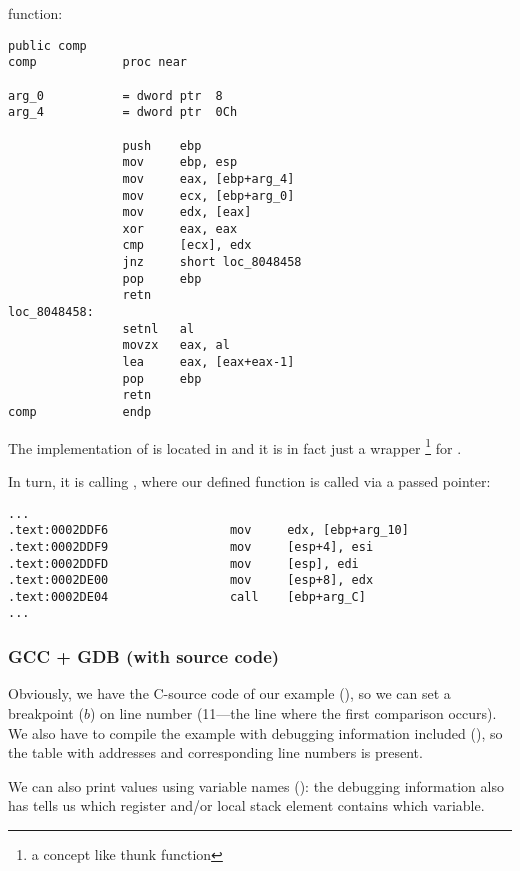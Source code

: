 \comp function:

\begin{lstlisting}[style=customasmx86]
                public comp
comp            proc near

arg_0           = dword ptr  8
arg_4           = dword ptr  0Ch

                push    ebp
                mov     ebp, esp
                mov     eax, [ebp+arg_4]
                mov     ecx, [ebp+arg_0]
                mov     edx, [eax]
                xor     eax, eax
                cmp     [ecx], edx
                jnz     short loc_8048458
                pop     ebp
                retn
loc_8048458:
                setnl   al
                movzx   eax, al
                lea     eax, [eax+eax-1]
                pop     ebp
                retn
comp            endp
\end{lstlisting}


The implementation of \qsort is located in  and it is in fact just a wrapper
\footnote{a concept like \gls{thunk function}} for .

In turn, it is calling , where our defined function is called via a passed pointer:

\begin{lstlisting}[caption=(file libc.so.6{,} glibc version---2.10.1),style=customasmx86]
...
.text:0002DDF6                 mov     edx, [ebp+arg_10]
.text:0002DDF9                 mov     [esp+4], esi
.text:0002DDFD                 mov     [esp], edi
.text:0002DE00                 mov     [esp+8], edx
.text:0002DE04                 call    [ebp+arg_C]
...
\end{lstlisting}

\subsubsection{GCC + GDB (with source code)}

Obviously, we have the C-source code of our example (), 
so we can set a breakpoint ($b$) on line number (11---the line where the first comparison occurs).
We also have to compile the example with debugging information included (), so the table
with addresses and corresponding line numbers is present.

We can also print values using variable names ():
the debugging information also has tells us which register and/or 
local stack element contains which variable.

